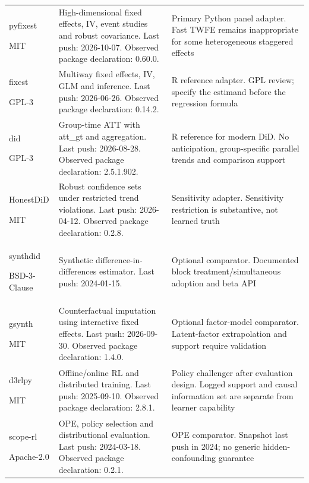 \begin{longtable}{P{29mm}P{55mm}P{60mm}}
pyfixest \citep{sw_pyfixest}\par MIT & High-dimensional fixed effects, IV, event studies and robust covariance. Last push: 2026-10-07. Observed package declaration: 0.60.0. & Primary Python panel adapter. Fast TWFE remains inappropriate for some heterogeneous staggered effects\\
fixest \citep{sw_fixest}\par GPL-3 & Multiway fixed effects, IV, GLM and inference. Last push: 2026-06-26. Observed package declaration: 0.14.2. & R reference adapter. GPL review; specify the estimand before the regression formula\\
did \citep{sw_did}\par GPL-3 & Group-time ATT with att\_gt and aggregation. Last push: 2026-08-28. Observed package declaration: 2.5.1.902. & R reference for modern DiD. No anticipation, group-specific parallel trends and comparison support\\
HonestDiD \citep{sw_honestdid}\par MIT & Robust confidence sets under restricted trend violations. Last push: 2026-04-12. Observed package declaration: 0.2.8. & Sensitivity adapter. Sensitivity restriction is substantive, not learned truth\\
synthdid \citep{sw_synthdid}\par BSD-3-Clause & Synthetic difference-in-differences estimator. Last push: 2024-01-15. & Optional comparator. Documented block treatment/simultaneous adoption and beta API\\
gsynth \citep{sw_gsynth}\par MIT & Counterfactual imputation using interactive fixed effects. Last push: 2026-09-30. Observed package declaration: 1.4.0. & Optional factor-model comparator. Latent-factor extrapolation and support require validation\\
d3rlpy \citep{sw_d3rlpy}\par MIT & Offline/online RL and distributed training. Last push: 2025-09-10. Observed package declaration: 2.8.1. & Policy challenger after evaluation design. Logged support and causal information set are separate from learner capability\\
scope-rl \citep{sw_scope_rl}\par Apache-2.0 & OPE, policy selection and distributional evaluation. Last push: 2024-03-18. Observed package declaration: 0.2.1. & OPE comparator. Snapshot last push in 2024; no generic hidden-confounding guarantee\\

\end{longtable}
